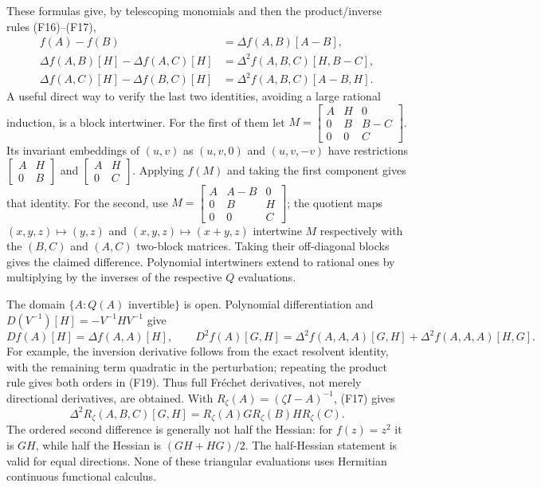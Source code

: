 \documentclass[11pt,a4paper]{article}
\begin{document}
These formulas give, by telescoping monomials and then the product/inverse
rules (F16)--(F17),
\begin{align*}
 f(A)-f(B)&=\Delta f(A,B)[A-B],\\
 \Delta f(A,B)[H]-\Delta f(A,C)[H]
 &=\Delta^2 f(A,B,C)[H,B-C],\\
 \Delta f(A,C)[H]-\Delta f(B,C)[H]
 &=\Delta^2 f(A,B,C)[A-B,H].                                \tag{F18}
\end{align*}
A useful direct way to verify the last two identities, avoiding a large
rational induction, is a block intertwiner. For the first of them let
$M=\left[\begin{smallmatrix}A&H&0\\0&B&B-C\\0&0&C\end{smallmatrix}\right]$.
Its invariant embeddings of $(u,v)$ as $(u,v,0)$ and $(u,v,-v)$ have
restrictions $\left[\begin{smallmatrix}A&H\\0&B\end{smallmatrix}\right]$
and $\left[\begin{smallmatrix}A&H\\0&C\end{smallmatrix}\right]$.
Applying $f(M)$ and taking the first component gives that identity. For
the second, use
$M=\left[\begin{smallmatrix}A&A-B&0\\0&B&H\\0&0&C\end{smallmatrix}\right]$;
the quotient maps $(x,y,z)\mapsto(y,z)$ and
$(x,y,z)\mapsto(x+y,z)$ intertwine $M$ respectively with the $(B,C)$
and $(A,C)$ two-block matrices. Taking their off-diagonal blocks gives
the claimed difference. Polynomial intertwiners extend to rational ones
by multiplying by the inverses of the respective $Q$ evaluations.

The domain $\{A:Q(A)\text{ invertible}\}$ is open. Polynomial
differentiation and $D(V^{-1})[H]=-V^{-1}HV^{-1}$ give
\[
 Df(A)[H]=\Delta f(A,A)[H],\qquad
 D^2f(A)[G,H]=\Delta^2f(A,A,A)[G,H]+\Delta^2f(A,A,A)[H,G].      \tag{F19}
\]
For example, the inversion derivative follows from the exact resolvent
identity, with the remaining term quadratic in the perturbation; repeating
the product rule gives both orders in (F19). Thus full Fr\'echet derivatives,
not merely directional derivatives, are obtained. With
$R_\zeta(A)=(\zeta I-A)^{-1}$, (F17) gives
\[
 \Delta^2R_\zeta(A,B,C)[G,H]=R_\zeta(A)G R_\zeta(B)H R_\zeta(C).
\]
The ordered second difference is generally not half the Hessian: for
$f(z)=z^2$ it is $GH$, while half the Hessian is $(GH+HG)/2$.
The half-Hessian statement is valid for equal directions. None of these
triangular evaluations uses Hermitian continuous functional calculus.
\end{document}
